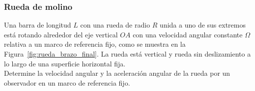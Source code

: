 \subsubsection{Rueda de molino}

Una barra de longitud \( L \) con una rueda de radio \( R \) unida a uno de sus extremos está rotando alrededor del eje vertical \( OA \) con una velocidad angular constante \( \Omega \) relativa a un marco de referencia fijo, como se muestra en la Figura~\ref{fig:rueda_brazo_final}. La rueda está vertical y rueda sin deslizamiento a lo largo de una superficie horizontal fija.\\

Determine la velocidad angular y la aceleración angular de la rueda por un observador en un marco de referencia fijo.\\

